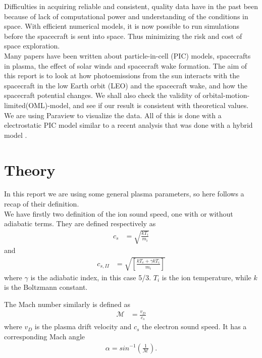 \documentclass[aip, 
rsi, 
amsmath,
amssymb,
longbibliography,
preprint]{revtex4-1}
\begin{document}
Difficulties in acquiring reliable and consistent, quality data have in the past been because of lack of computational power and understanding of the conditions in space. With efficient numerical models, it is now possible to run simulations before the spacecraft is sent into space. Thus minimizing the risk and cost of space exploration. \\

Many papers have been written about particle-in-cell (PIC) models, spacecrafts in plasma, the effect of solar winds and spacecraft wake formation. The aim of this report is to look at how photoemissions from the sun interacts with the spacecraft in the low Earth orbit (LEO) and the spacecraft wake, and how the spacecraft potential changes. We shall also check the validity of orbital-motion-limited(OML)-model, and see if our result is consistent with theoretical values. We are using Paraview to visualize the data. All of this is done with a electrostatic PIC model similar to a recent analysis that was done with a hybrid model \cite{P7}.

\section{\label{sec:theory} Theory}

In this report we are using some general plasma parameters, so here follows a recap of their definition.\\

We have firstly two definition of the ion sound speed, one with or without adiabatic terms. They are defined respectively as 
\begin{align}
c_s &= \sqrt{\frac{k T_i}{m_i}}\label{eq:IonSpeed}
\end{align}
and
\begin{align}
c_{s,II} &= \sqrt{\left[ \frac{kT_e + \gamma k T_i}{m_i}\right]}\label{eq:IonSpeed2}
\end{align}
where $\gamma$ is the adiabatic index, in this case 5/3. $T_i$ is the ion temperature, while $k$ is the Boltzmann constant.

The Mach number similarly is defined as
\begin{align}
\mathcal{M} &= \frac{v_D}{c_s}\label{eq:Mach}
\end{align}
where $v_D$ is the plasma drift velocity and $c_s$ the electron sound speed. It has a corresponding Mach angle
\begin{align}
\alpha = sin^{-1}(\frac{1}{\mathcal{M}})\label{eq:MachAngle}.
\end{align}
\end{document}
